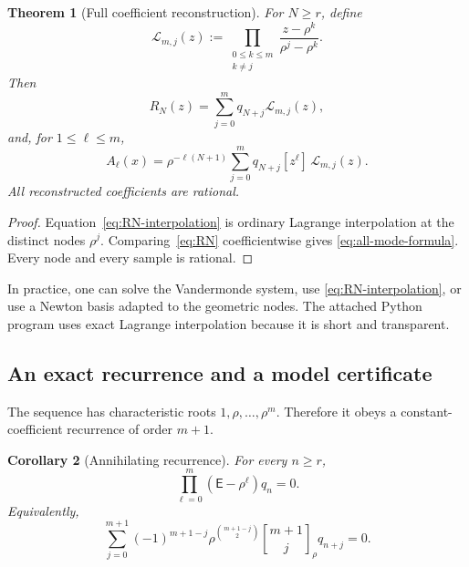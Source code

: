 \documentclass[11pt,a4paper]{article}
\newtheorem{theorem}{Theorem}[section]
\newtheorem{corollary}[theorem]{Corollary}
\theoremstyle{remark}
\newcommand{\E}{\mathsf{E}}
\newcommand{\coeff}[2]{[z^{#1}]\,#2}
\newcommand{\qbinom}[3]{\genfrac{[}{]}{0pt}{}{#1}{#2}_{#3}}
\begin{document}
\begin{theorem}[Full coefficient reconstruction]
\label{thm:full-reconstruction}
For $N\ge r$, define
\begin{equation}
 \mathcal L_{m,j}(z):=
 \prod_{\substack{0\le k\le m\\k\ne j}}
 \frac{z-\rho^k}{\rho^j-\rho^k}.
 \label{eq:lagrange-cardinal}
\end{equation}
Then
\begin{equation}
 R_N(z)=\sum_{j=0}^{m}q_{N+j}\mathcal L_{m,j}(z),
 \label{eq:RN-interpolation}
\end{equation}
and, for $1\le\ell\le m$,
\begin{equation}
 \boxed{
 A_\ell(x)=\rho^{-\ell(N+1)}
 \sum_{j=0}^{m}q_{N+j}\coeff{\ell}{\mathcal L_{m,j}(z)}. }
 \label{eq:all-mode-formula}
\end{equation}
All reconstructed coefficients are rational.
\end{theorem}

\begin{proof}
Equation~\eqref{eq:RN-interpolation} is ordinary Lagrange interpolation at the
distinct nodes $\rho^j$.  Comparing~\eqref{eq:RN} coefficientwise gives
\eqref{eq:all-mode-formula}.  Every node and every sample is rational.
\end{proof}

In practice, one can solve the Vandermonde system, use
\eqref{eq:RN-interpolation}, or use a Newton basis adapted to the geometric
nodes.  The attached Python program uses exact Lagrange interpolation because
it is short and transparent.

\subsection{An exact recurrence and a model certificate}

The sequence has characteristic roots
$1,\rho,\ldots,\rho^m$.  Therefore it obeys a constant-coefficient recurrence
of order $m+1$.

\begin{corollary}[Annihilating recurrence]
\label{cor:annihilating-recurrence}
For every $n\ge r$,
\begin{equation}
 \prod_{\ell=0}^{m}(\E-\rho^\ell)q_n=0.
 \label{eq:annihilator-recurrence-operator}
\end{equation}
Equivalently,
\begin{equation}
 \boxed{
 \sum_{j=0}^{m+1}(-1)^{m+1-j}
 \rho^{\binom{m+1-j}{2}}
 \qbinom{m+1}{j}{\rho}q_{n+j}=0. }
 \label{eq:annihilator-recurrence-expanded}
\end{equation}
\end{corollary}
\end{document}
